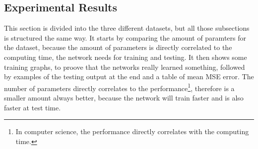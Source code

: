 \begin{center}
  \end{center}
  
 \subsection{Experimental Results}
  This section is divided into the three different datasets, but all those subsections is structured the same way. It starts by comparing the amount of paramters
  for the dataset, because the amount of parameters is directly correlated to the computing time, the network needs for training and testing. It then shows
  some training graphs, to proove that the networks really learned something, followed by examples of the testing output at the end and a table of mean MSE error.
  The number of parameters directly correlates to the performance\footnote{In computer science, the performance directly correlates with the computing time.}, 
  therefore is a smaller amount always better, because the network will train faster and is also faster at test time.
 
